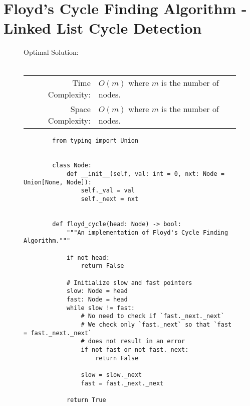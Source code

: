 
\section{Floyd's Cycle Finding Algorithm - Linked List Cycle Detection}

\begin{figure}[H]
    Optimal Solution:\\\\
    \begin{tabular}{rl}
        Time Complexity:& \(O(m)\) where \(m\) is the number of nodes.\\
        Space Complexity:& \(O(m)\) where \(m\) is the number of nodes.
    \end{tabular}
\end{figure}

\begin{figure}[H]
    \centering
    \begin{verbatim}
        from typing import Union


        class Node:
            def __init__(self, val: int = 0, nxt: Node = Union[None, Node]):
                self._val = val
                self._next = nxt


        def floyd_cycle(head: Node) -> bool:
            """An implementation of Floyd's Cycle Finding Algorithm."""

            if not head:
                return False

            # Initialize slow and fast pointers
            slow: Node = head
            fast: Node = head
            while slow != fast:
                # No need to check if `fast._next._next`
                # We check only `fast._next` so that `fast = fast._next._next`
                # does not result in an error
                if not fast or not fast._next:
                    return False

                slow = slow._next
                fast = fast._next._next

            return True
    \end{verbatim}
\end{figure}
